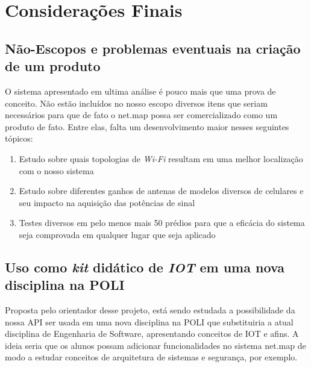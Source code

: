 \chapter{Considerações Finais}



\section{Não-Escopos e problemas eventuais na criação de um produto}
O sistema apresentado em ultima análise é pouco mais que uma prova de conceito. Não estão incluídos no nosso escopo diversos itens que seriam necessários para que de fato o net.map possa ser comercializado como um produto de fato. Entre elas, falta um desenvolvimento maior nesses seguintes tópicos:


\begin{enumerate}
\item Estudo sobre quais topologias de \textit{Wi-Fi} resultam em uma melhor localização com o nosso sistema
\item Estudo sobre diferentes ganhos de antenas de modelos diversos de celulares e seu impacto na aquisição das potências de sinal 
\item Testes diversos em pelo menos mais 50 prédios para que a eficácia do sistema seja comprovada em qualquer lugar que seja aplicado
\end{enumerate}



\section{Uso como \textit{kit} didático de \textit{IOT} em uma nova disciplina na POLI}
Proposta pelo orientador desse projeto, está sendo estudada a possibilidade da nossa API ser usada em uma nova disciplina na POLI que substituiria a atual disciplina de Engenharia de Software, apresentando conceitos de IOT e afins. A ideia seria que os alunos possam adicionar funcionalidades no sistema net.map de modo a estudar conceitos de arquitetura de sistemas e segurança, por exemplo.
